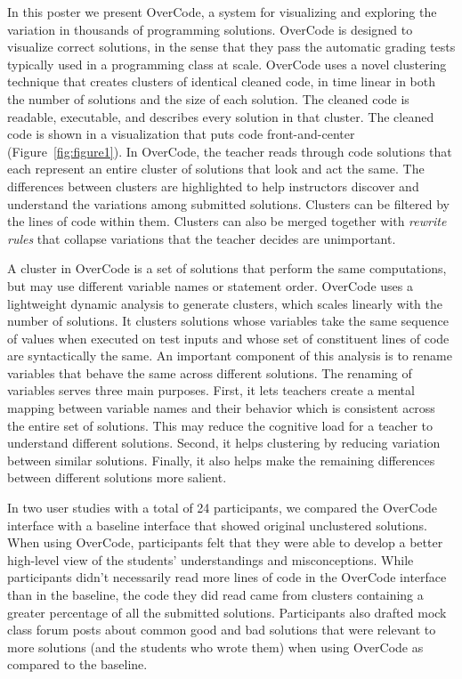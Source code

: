 \documentclass{sigchi}
\begin{document}
In this poster we present OverCode, a system for visualizing and exploring the variation in thousands of programming solutions.  OverCode is designed to visualize correct solutions, in the sense that they pass the automatic grading tests typically used in a programming class at scale.  OverCode uses a novel clustering technique that creates clusters of identical cleaned code, in time linear in both the number of solutions and the size of each solution. The cleaned code is readable, executable, and describes every solution in that cluster.  The cleaned code is shown in a visualization that puts code front-and-center (Figure~\ref{fig:figure1}). In OverCode, the teacher reads through code solutions that each represent an entire cluster of solutions that look and act the same. The differences between clusters are highlighted to help instructors discover and understand the variations among submitted solutions. Clusters can be filtered by the lines of code within them.  Clusters can also be merged together with {\em rewrite rules} that collapse variations that the teacher decides are unimportant. 

A cluster in OverCode is a set of solutions that perform the same computations, but may use different variable names or statement order.  OverCode uses a lightweight dynamic analysis to generate clusters, which scales linearly with the number of solutions. It clusters solutions whose variables take the same sequence of values when executed on test inputs and whose set of constituent lines of code are syntactically the same. An important component of this analysis is to rename variables that behave the same across different solutions. The renaming of variables serves three main purposes. First, it lets teachers create a mental mapping between variable names and their behavior which is consistent across the entire set of solutions. This may reduce the cognitive load for a teacher to understand different solutions. Second, it helps clustering by reducing variation between similar solutions. Finally, it also helps make the remaining differences between different solutions more salient. 

In two user studies with a total of 24 participants, we compared the OverCode interface with a baseline interface that showed original unclustered solutions. When using OverCode, participants felt that they were able to develop a better high-level view of the students' understandings and misconceptions. While participants didn't necessarily read more lines of code in the OverCode interface than in the baseline, the code they did read came from clusters containing a greater percentage of all the submitted solutions. Participants also drafted mock class forum posts about common good and bad solutions that were relevant to more solutions (and the students who wrote them) when using OverCode as compared to the baseline. 
\end{document}
